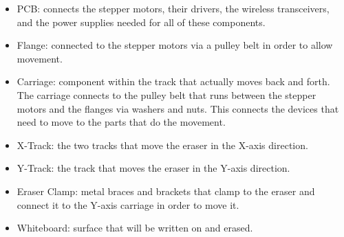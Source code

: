 \begin{itemize}
	\item PCB: connects the stepper motors, their drivers, the wireless transceivers, and the power supplies needed for all of these components.
	\item Flange: connected to the stepper motors via a pulley belt in order to allow movement.
	\item Carriage: component within the track that actually moves back and forth. The carriage connects to the pulley belt that runs between the stepper motors and the flanges via washers and nuts. This connects the devices that need to move to the parts that do the movement.
	\item X-Track: the two tracks that move the eraser in the X-axis direction.
	\item Y-Track: the track that moves the eraser in the Y-axis direction.
	\item Eraser Clamp: metal braces and brackets that clamp to the eraser and connect it to the Y-axis carriage in order to move it.
	\item Whiteboard: surface that will be written on and erased.
	 
\end{itemize} \par
